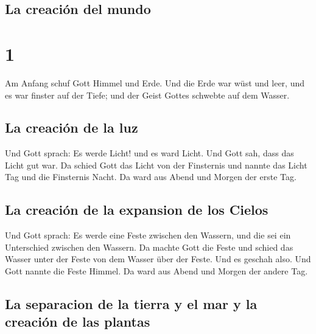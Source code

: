 \hypertarget{la-creaciuxf3n-del-mundo}{%
\subsection{La creación del mundo}\label{la-creaciuxf3n-del-mundo}}

\hypertarget{section}{%
\section{1}\label{section}}

 Am Anfang schuf Gott Himmel und Erde.  Und
die Erde war wüst und leer, und es war finster auf der Tiefe; und der
Geist Gottes schwebte auf dem Wasser.

\hypertarget{la-creaciuxf3n-de-la-luz}{%
\subsection{La creación de la luz}\label{la-creaciuxf3n-de-la-luz}}

 Und Gott sprach: Es werde Licht! und es ward Licht.
 Und Gott sah, dass das Licht gut war. Da schied Gott das
Licht von der Finsternis  und nannte das Licht Tag und die
Finsternis Nacht. Da ward aus Abend und Morgen der erste Tag.

\hypertarget{la-creaciuxf3n-de-la-expansion-de-los-cielos}{%
\subsection{La creación de la expansion de los
Cielos}\label{la-creaciuxf3n-de-la-expansion-de-los-cielos}}

 Und Gott sprach: Es werde eine Feste zwischen den
Wassern, und die sei ein Unterschied zwischen den Wassern.
 Da machte Gott die Feste und schied das Wasser unter der
Feste von dem Wasser über der Feste. Und es geschah also. 
Und Gott nannte die Feste Himmel. Da ward aus Abend und Morgen der
andere Tag.

\hypertarget{la-separacion-de-la-tierra-y-el-mar-y-la-creaciuxf3n-de-las-plantas}{%
\subsection{La separacion de la tierra y el mar y la creación de las
plantas}\label{la-separacion-de-la-tierra-y-el-mar-y-la-creaciuxf3n-de-las-plantas}}

